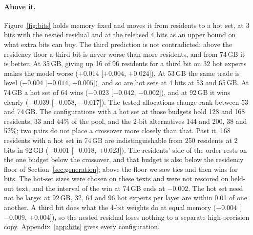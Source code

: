 \documentclass[11pt]{article}
\newcommand{\ci}[2]{[$#1$, $#2$]}
\begin{document}
\paragraph{Above it.} Figure~\ref{fig:bits} holds memory fixed and moves it from residents to
a hot set, at 3 bits with the nested residual and at the released 4 bits as an upper bound on
what extra bits can buy. The third prediction is not contradicted: above the residency floor a third bit is never worse than more residents, and from 74\,GB it is better. At 35\,GB, giving up 16 of 96 residents for a third bit
on 32 hot experts makes the model worse ($+0.014$ \ci{+0.004}{+0.024}). At 53\,GB the same
trade is level ($-0.004$ \ci{-0.014}{+0.005}), and so are hot sets at 4 bits at 53 and
65\,GB. At 74\,GB a hot set of 64 wins ($-0.023$ \ci{-0.042}{-0.002}), and at 92\,GB it wins
clearly ($-0.039$ \ci{-0.058}{-0.017}). The tested allocations change rank between 53 and 74\,GB. The configurations with a hot set at those budgets hold 128 and 168 residents, 33 and 44\% of the pool, and the 2-bit alternatives 144 and 200, 38 and 52\%; two pairs do not place a crossover more closely than that. Past it, 168 residents with a hot set in 74\,GB are indistinguishable from 250 residents at 2 bits in 92\,GB ($+0.001$ \ci{-0.018}{+0.023}). The residents' side of the order rests on the one budget below the crossover, and that budget is also below the residency floor of Section~\ref{sec:generation}; above the floor we saw ties and then wins for bits. The hot-set sizes were chosen on these texts and were not rescored on held-out text, and the interval of the win at 74\,GB ends at $-0.002$. The hot set need not be large: at 92\,GB, 32, 64 and 96 hot experts per layer are within 0.01 of one another. A third bit
does what the 4-bit weights do at equal memory ($-0.004$ \ci{-0.009}{+0.004}), so the nested
residual loses nothing to a separate high-precision copy. Appendix~\ref{app:bits} gives every
configuration.
\end{document}
